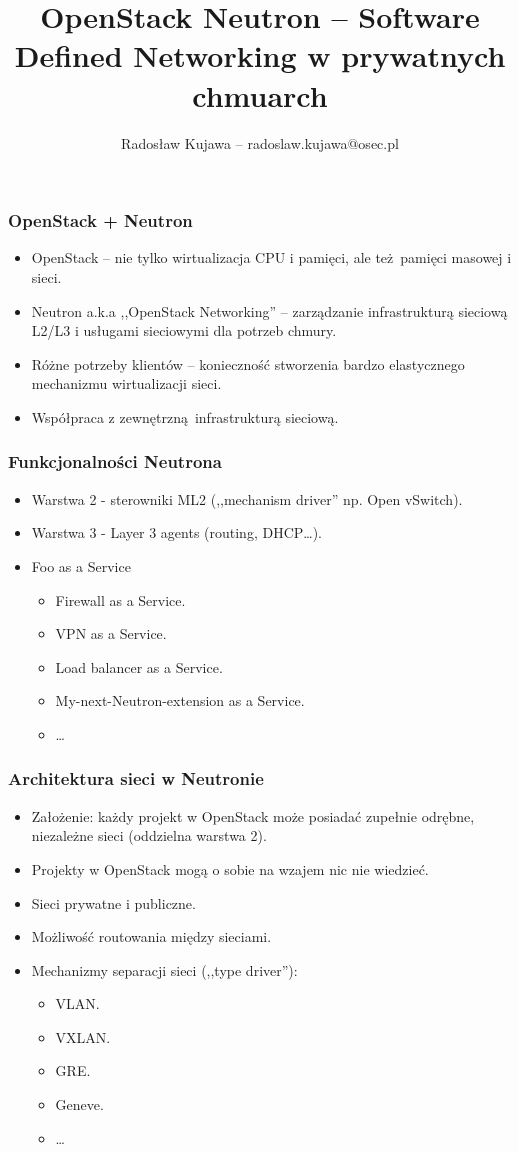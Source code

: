 \documentclass[dvipsnames,table]{beamer}
\title{OpenStack Neutron -- Software Defined Networking w prywatnych chmuarch}
\author{Radosław Kujawa -- radoslaw.kujawa@osec.pl}
\institute{OSEC}
\begin{document}
\begin{frame}
	\titlepage
\end{frame}

\begin{frame}
\frametitle{OpenStack + Neutron}
\begin{itemize}
	\item OpenStack -- nie tylko wirtualizacja CPU i pamięci, ale też pamięci masowej i sieci.
	\item Neutron a.k.a ,,OpenStack Networking'' -- zarządzanie infrastrukturą sieciową L2/L3 i usługami sieciowymi dla potrzeb chmury.
	\item Różne potrzeby klientów -- konieczność stworzenia bardzo elastycznego mechanizmu wirtualizacji sieci.
	\item Współpraca z zewnętrzną infrastrukturą sieciową.
\end{itemize}
\end{frame}

\begin{frame}
\frametitle{Funkcjonalności Neutrona}
\begin{itemize}
	\item Warstwa 2 - sterowniki ML2 (,,mechanism driver'' np. Open vSwitch).
	\item Warstwa 3 - Layer 3 agents (routing, DHCP\dots).
	\item Foo as a Service
	\begin{itemize}
		\item Firewall as a Service.
		\item VPN as a Service.
		\item Load balancer as a Service.
		\item My-next-Neutron-extension as a Service.
		\item \dots 
	\end{itemize}
\end{itemize}
\end{frame}

\begin{frame}
\frametitle{Architektura sieci w Neutronie}
\begin{itemize}
	\item Założenie: każdy projekt w OpenStack może posiadać zupełnie odrębne, niezależne sieci (oddzielna warstwa 2).
	\item Projekty w OpenStack mogą o sobie na wzajem nic nie wiedzieć.
	\item Sieci prywatne i publiczne.
	\item Możliwość routowania między sieciami.
	\item Mechanizmy separacji sieci (,,type driver''):
	\begin{itemize}
		\item VLAN.
		\item VXLAN.
		\item GRE.
		\item Geneve.
		\item \dots
	\end{itemize}
\end{itemize}
\end{frame}
\end{document}
